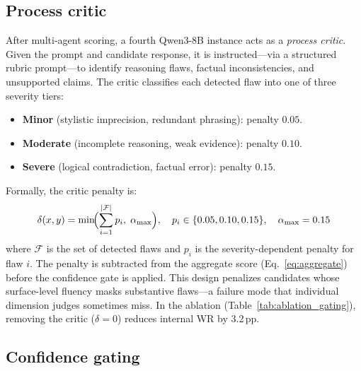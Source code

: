 \documentclass{article}
\begin{document}
\subsection{Process critic}
\label{sec:critic}

After multi-agent scoring, a fourth Qwen3-8B instance acts as a \emph{process critic}. Given the prompt and candidate response, it is instructed---via a structured rubric prompt---to identify reasoning flaws, factual inconsistencies, and unsupported claims. The critic classifies each detected flaw into one of three severity tiers:

\begin{itemize}[nosep,leftmargin=*]
    \item \textbf{Minor} (stylistic imprecision, redundant phrasing): penalty $0.05$.
    \item \textbf{Moderate} (incomplete reasoning, weak evidence): penalty $0.10$.
    \item \textbf{Severe} (logical contradiction, factual error): penalty $0.15$.
\end{itemize}

Formally, the critic penalty is:
\begin{equation}
    \delta(x,y) = \min\!\Bigl(\sum_{i=1}^{|\mathcal{F}|} p_i,\; \alpha_{\max}\Bigr), \quad p_i \in \{0.05, 0.10, 0.15\}, \quad \alpha_{\max} = 0.15
    \label{eq:critic}
\end{equation}
where $\mathcal{F}$ is the set of detected flaws and $p_i$ is the severity-dependent penalty for flaw $i$. The penalty is subtracted from the aggregate score (Eq.~\ref{eq:aggregate}) before the confidence gate is applied. This design penalizes candidates whose surface-level fluency masks substantive flaws---a failure mode that individual dimension judges sometimes miss. In the ablation (Table~\ref{tab:ablation_gating}), removing the critic ($\delta{=}0$) reduces internal WR by 3.2\,pp.

\subsection{Confidence gating}
\label{sec:gating}
\end{document}
